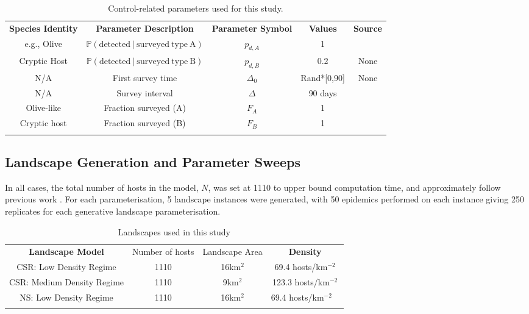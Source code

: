 \documentclass[11pt,letterpaper]{article}
\newlength\savedwidth
\newcommand\thickhline{\noalign{\global\savedwidth\arrayrulewidth\global\arrayrulewidth 2pt}%
\hline
\noalign{\global\arrayrulewidth\savedwidth}}
\begin{document}
\begin{table}
    \centering
    \begin{adjustbox}{width=\textwidth}
    \begin{tabular}{|c|c|c|c|c|}
    \thickhline
        \textbf{Species Identity}  & \textbf{Parameter Description} & \textbf{Parameter Symbol} & \textbf{Values} & \textbf{Source} \\
        \thickhline \thickhline
        e.g., Olive & $\mathbb{P} \mathrm{(detected\:|\:surveyed\:type\:A)}$& $p_{d,A}$& 1 & \cite{Bragard2019} \\   
        \thickhline
         Cryptic Host & $\mathbb{P} \mathrm{(detected\:|\:surveyed\:type\:B)}$& $p_{d,B}$& 0.2 & None\\        
        \thickhline
         N/A & First survey time & $\Delta_{0}$& Rand*[0,90] & None\\
        \thickhline
        N/A & Survey interval & $\Delta$ & 90 days&  \cite{HyattTwynam2017}\\
        \thickhline
         Olive-like & Fraction surveyed (A)  & $F_{A}$ & 1 &  \cite{HyattTwynam2017}\\
        \thickhline
         Cryptic host & Fraction surveyed (B) & $F_{B}$ & 1 & \cite{HyattTwynam2017}\\
        \thickhline
    \end{tabular}

    \label{controlparms}
        \end{adjustbox}
    \caption{Control-related parameters used for this study. }
\end{table}

\FloatBarrier
\subsection*{Landscape Generation and Parameter Sweeps}

In all cases, the total number of hosts in the model, $N$, was set at 1110 to upper bound computation time, and approximately follow previous work \cite{HyattTwynam2017}. For each parameterisation, 5 landscape instances were generated, with 50 epidemics performed on each instance giving 250 replicates for each generative landscape parameterisation.


\begin{table}

    \begin{tabular}{|c|c|c|c|}
    \thickhline
        \textbf{Landscape Model} & Number of hosts & Landscape Area & \textbf{Density}
     \\
        \thickhline \thickhline
        CSR: Low Density Regime & 1110 & 16km$^{2}$ & 69.4 hosts/km$^{-2}$ \\
        \thickhline
        CSR: Medium Density Regime & 1110 & 9km$^{2}$& 123.3 hosts/km$^{-2}$ \\
        \thickhline
        NS: Low Density Regime & 1110 & 16km$^{2}$ &  69.4 hosts/km$^{-2}$ \ \\
        \thickhline
            \end{tabular}
    \caption{   \label{lscapes} Landscapes used in this study}
\end{table}
\end{document}

